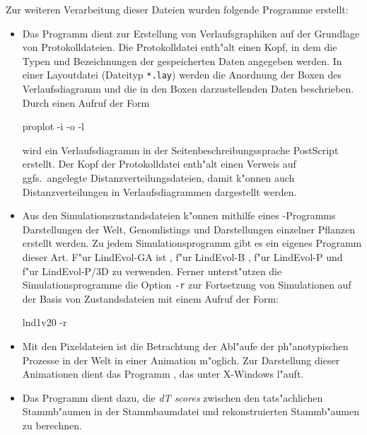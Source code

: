 \begin{appendix}
Zur weiteren Verarbeitung dieser Dateien wurden folgende Programme erstellt:

\begin{itemize}

\item Das Programm  dient zur Erstellung von Verlaufsgraphiken auf der Grundlage
von Protokolldateien. Die Protokolldatei enth"alt einen Kopf, in dem die Typen und Bezeichnungen
der gespeicherten Daten angegeben werden. In einer Layoutdatei (Dateityp \verb|*.lay|) werden die
Anordnung der Boxen des Verlaufsdiagramm und die in den Boxen darzustellenden Daten beschrieben.
Durch einen Aufruf der Form

\begin{verbatimcmd}
proplot -i  -o  -l 
\end{verbatimcmd}

wird ein Verlaufsdiagramm in der Seitenbeschreibungssprache PostScript \cite{PostScript} erstellt.
Der Kopf der Protokolldatei enth"alt einen Verweis auf ggfs.\ angelegte Distanzverteilungsdateien,
damit k"onnen auch Distanzverteilungen in Verlaufsdiagrammen dargestellt werden.

\item Aus den Simulationszustandsdateien k"onnen mithilfe eines -Programms Darstellungen
der Welt, Genomlistings und Darstellungen einzelner Pflanzen erstellt werden. Zu jedem Simulationsprogramm
gibt es ein eigenes Programm dieser Art. F"ur LindEvol-GA ist , f"ur LindEvol-B ,
f"ur LindEvol-P  und f"ur LindEvol-P/3D  zu verwenden. Ferner unterst"utzen
die Simulationsprogramme die Option \verb|-r| zur Fortsetzung von Simulationen auf der Basis von Zustandsdateien
mit einem Aufruf der Form:

\begin{verbatimcmd}
lnd1v20 -r 
\end{verbatimcmd}

\item Mit den Pixeldateien ist die Betrachtung der Abl"aufe der ph"anotypischen Prozesse in der Welt
in einer Animation m"oglich. Zur Darstellung dieser Animationen dient das Programm ,
das unter X-Windows l"auft.

\item \begin{sloppypar} Das Programm  dient dazu, die \textsl{dT scores} zwischen den tats"achlichen Stammb"aumen
in der Stammbaumdatei und rekonstruierten Stammb"aumen zu berechnen.
\end{sloppypar}


\end{itemize}
\end{appendix}
